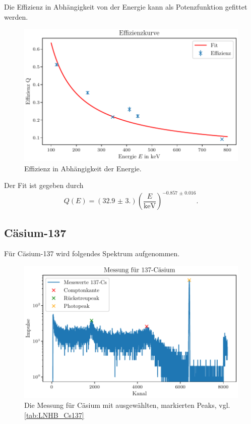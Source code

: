 Die Effizienz in Abhängigkeit von der Energie kann als Potenzfunktion gefittet werden.

\begin{figure}[H]
    \centering
    \includegraphics[width=\textwidth]{plots/EuEffizienz.pdf}
    \caption{Effizienz in Abhängigkeit der Energie.}
    \label{fig:effizienz}
\end{figure}

Der Fit ist gegeben durch
\begin{equation}
    Q(E) = \left(\num{32.9(3.0)}\right)\left({\frac{E}{\si{\kilo\electronvolt}}}\right)^{\num{-0.857(16)}}.
    \label{eq:fiteffizienz}
\end{equation}

\subsection{Cäsium-137}

Für Cäsium-137 wird folgendes Spektrum aufgenommen.

\begin{figure}[H]
    \centering
    \includegraphics[width=\textwidth]{plots/Caesium.pdf}
    \caption{Die Messung für Cäsium mit ausgewählten, markierten Peaks, vgl. \autoref{tab:LNHB_Cs137}}
    \label{fig:Cäsium}
\end{figure}


